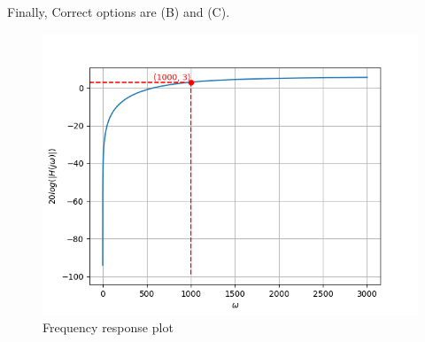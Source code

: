 \documentclass[journal,12pt,twocolumn]{IEEEtran}
\theoremstyle{remark}
\begin{document}
Finally, Correct options are (B) and (C).

\begin{figure}[H]
  \centering
  \includegraphics[width=1.0\columnwidth]{2022/EC/26/figs/plot1.png}
  \caption{\centering Frequency response plot}
  \label{fig:26fig3}
\end{figure}
\end{document}
